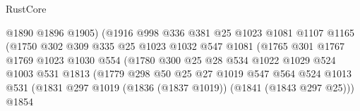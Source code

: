 \begin{lexlean}{RustCore}
\begin{coremodule}
                                    @1890
                                    @1896
                                    @1905)
                                  (@1916
                                    @998
                                    @336
                                    @381
                                    @25
                                    @1023
                                    @1081
                                    @1107
                                    @1165
                                    (@1750
                                      @302
                                      @309
                                      @335
                                      @25
                                      @1023
                                      @1032
                                      @547
                                      @1081
                                      (@1765
                                        @301
                                        @1767
                                        @1769
                                        @1023
                                        @1030
                                        @554
                                        (@1780
                                          @300
                                          @25
                                          @28
                                          @534
                                          @1022
                                          @1029
                                          @524
                                          @1003
                                          @531
                                          @1813
                                          (@1779
                                            @298
                                            @50
                                            @25
                                            @27
                                            @1019
                                            @547
                                            @564
                                            @524
                                            @1013
                                            @531
                                            (@1831
                                              @297
                                              @1019
                                              (@1836 (@1837 @1019))
                                              (@1841 (@1843 @297 @25)))
                                            @1854

\end{coremodule}
\end{lexlean}
